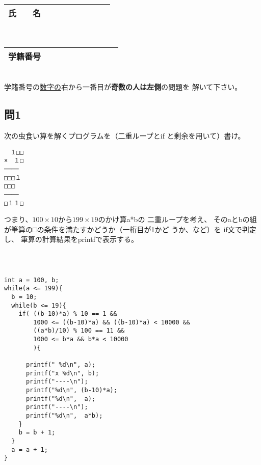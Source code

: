 \documentclass[a4j]{jarticle}
\def\ds{\displaystyle}
\begin{document}
\thispagestyle{empty}

\begin{multicols*}{2}%


\def\subst#1#2{$\ds #1$
 \ $\longrightarrow$\ 
 \underline{\hbox to 5cm{\ttfamily #2}}}



\noindent
\begin{tabular}[t]{|c|cccccccc|}\hline
氏　　名 & & & & & & & & \\ \hline
\end{tabular}\\
\begin{tabular}[t]{|c|c|c|c|c|c|c|c|c|c|}\hline
学籍番号 & & & & & & & & \\ \hline
\end{tabular}\\
学籍番号の\underline{数字の}右から一番目が{\bfseries 奇数の人は左側}の問題を
解いて下さい。
\vspace{-5ex}







\subsection*{問1}

次の虫食い算を解くプログラムを（二重ループと{\ttfamily if}
と剰余を用いて）書け。
\begin{verbatim}
　１□□
×　１□
────
□□□１
□□□
────
□１１□
\end{verbatim}
つまり、$100\times10$から$199\times19$のかけ算{\ttfamily a*b}の
二重ループを考え、
その{\ttfamily aとb}の組が筆算の{\bfseries □}の条件を満たすかどうか（一桁目が1かど
うか、など）を
{\ttfamily if}文で判定し、
筆算の計算結果を{\ttfamily printf}で表示する。


\ifnum {}
\begin{verbatim}

\end{verbatim}
\vspace{14cm}
\vfill
\mbox{}\\
\else
\begin{verbatim}
int a = 100, b;
while(a <= 199){
  b = 10;
  while(b <= 19){
    if( ((b-10)*a) % 10 == 1 &&
        1000 <= ((b-10)*a) && ((b-10)*a) < 10000 &&
        ((a*b)/10) % 100 == 11 &&
        1000 <= b*a && b*a < 10000
        ){

      printf(" %d\n", a);
      printf("x %d\n", b);
      printf("----\n");
      printf("%d\n", (b-10)*a);
      printf("%d\n",  a);
      printf("----\n");
      printf("%d\n",  a*b);
    }
    b = b + 1;
  }
  a = a + 1;
}



\end{verbatim}
\end{multicols*}
\end{document}
